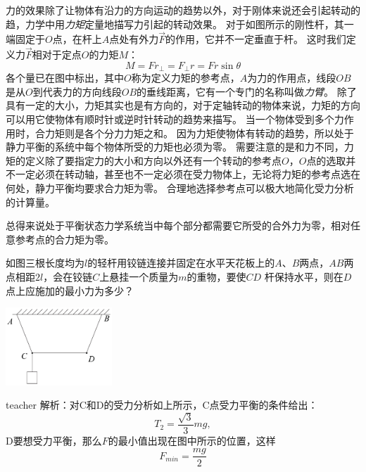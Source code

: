 力的效果除了让物体有沿力的方向运动的趋势以外，对于刚体来说还会引起转动的趋，力学中用\emph{力矩}定量地描写力引起的转动效果。
对于如图所示的刚性杆，其一端固定于$O$点，在杆上$A$点处有外力$\vec{F}$的作用，它并不一定垂直于杆。
这时我们定义力$\vec{F}$相对于定点$O$的力矩$M$：
\begin{equation}
M = F r_{\perp} = F_\perp r = Fr\sin\theta
\end{equation}
各个量已在图中标出，其中$O$称为定义力矩的参考点，$A$为力的作用点，线段$OB$是从$O$到代表力的方向线段$OB$的垂线距离，它有一个专门的名称叫做\emph{力臂}。
除了具有一定的大小，力矩其实也是有方向的，对于定轴转动的物体来说，力矩的方向可以用它使物体有顺时针或逆时针转动的趋势来描写。
当一个物体受到多个力作用时，合力矩则是各个分力力矩之和。
因为力矩使物体有转动的趋势，所以处于静力平衡的系统中每个物体所受的力矩也必须为零。
需要注意的是和力不同，力矩的定义除了要指定力的大小和方向以外还有一个转动的参考点$O$，$O$点的选取并不一定必须在转动轴，甚至也不一定必须在受力物体上，无论将力矩的参考点选在何处，静力平衡均要求合力矩为零。
合理地选择参考点可以极大地简化受力分析的计算量。

总得来说处于平衡状态力学系统当中每个部分都需要它所受的合外力为零，相对任意参考点的合力矩为零。



\begin{example}

如图三根长度均为$l$的轻杆用铰链连接并固定在水平天花板上的$A、B$两点，$AB$两点相距$2l$，会在铰链$C$上悬挂一个质量为$m$的重物，要使$CD$ 杆保持水平，则在$D$点上应施加的最小力为多少？
\begin{flushright}
\includegraphics[width = 0.3\textwidth]{images/static-force-11.pdf} 
\end{flushright}
\begin{taggedblock}{teacher}
\vspace*{3cm}
\noindent
解析：对C和D的受力分析如上所示，C点受力平衡的条件给出：
\[
T_2 = \frac{\sqrt{3}}{3}mg,
\]
D要想受力平衡，那么$F$的最小值出现在图中所示的位置，这样
\[
F_{min} = \frac{mg}{2}
\]
\end{taggedblock}
\end{example}


